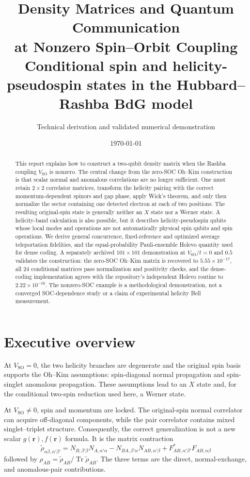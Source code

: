 \documentclass[11pt]{article}
\title{\textbf{Density Matrices and Quantum Communication\\at Nonzero Spin--Orbit Coupling}\\[0.5em]
\large Conditional spin and helicity-pseudospin states in the Hubbard--Rashba BdG model}
\author{Technical derivation and validated numerical demonstration}
\date{\today}
\newcommand{\SO}{V_{\mathrm{SO}}}
\newcommand{\tr}{\operatorname{Tr}}
\newcommand{\rr}{\mathbf r}
\begin{document}
\maketitle

\begin{abstract}
\noindent
This report explains how to construct a two-qubit density matrix when the Rashba coupling $\SO$ is nonzero. The central change from the zero-SOC Oh--Kim construction is that scalar normal and anomalous correlations are no longer sufficient. One must retain $2\times2$ correlator matrices, transform the helicity pairing with the correct momentum-dependent spinors and gap phase, apply Wick's theorem, and only then normalize the sector containing one detected electron at each of two positions. The resulting original-spin state is generally neither an $X$ state nor a Werner state. A helicity-band calculation is also possible, but it describes helicity-pseudospin qubits whose local modes and operations are not automatically physical spin qubits and spin operations. We derive general concurrence, fixed-reference and optimized average teleportation fidelities, and the equal-probability Pauli-ensemble Holevo quantity used for dense coding. A separately archived $101\times101$ demonstration at $\SO/t=0$ and $0.5$ validates the construction: the zero-SOC Oh--Kim matrix is recovered to $5.55\times10^{-17}$, all 24 conditional matrices pass normalization and positivity checks, and the dense-coding implementation agrees with the repository's independent Holevo routine to $2.22\times10^{-16}$. The nonzero-SOC example is a methodological demonstration, not a converged SOC-dependence study or a claim of experimental helicity Bell measurement.
\end{abstract}

\tableofcontents
\clearpage

\section{Executive overview}
\label{sec:overview}

At $\SO=0$, the two helicity branches are degenerate and the original spin basis supports the Oh--Kim assumptions: spin-diagonal normal propagation and spin-singlet anomalous propagation. These assumptions lead to an $X$ state and, for the conditional two-spin reduction used here, a Werner state.

At $\SO\neq0$, spin and momentum are locked. The original-spin normal correlator can acquire off-diagonal components, while the pair correlator contains mixed singlet--triplet structure. Consequently, the correct generalization is not a new scalar $g(\rr),f(\rr)$ formula. It is the matrix contraction
\begin{equation}
\boxed{
\widetilde\rho_{\alpha\beta,\alpha'\beta'}
=
N_{B,\beta'\beta}N_{A,\alpha'\alpha}
-N_{BA,\beta'\alpha}N_{AB,\alpha'\beta}
+F_{AB,\alpha'\beta'}^{*}F_{AB,\alpha\beta}
}
\label{eq:headline}
\end{equation}
followed by $\rho_{AB}=\widetilde\rho_{AB}/\tr\widetilde\rho_{AB}$. The three terms are the direct, normal-exchange, and anomalous-pair contributions.
\end{document}
